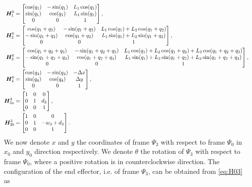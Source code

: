 \documentclass[../DC2017114Bouma.tex]{subfiles}
\begin{document}
\begin{align}
{\boldsymbol{H}}^0_1 &= \begin{bmatrix}
\cos(q_1) & -\sin(q_1) & L_1\cos(q_1) \\
\sin(q_1) & \cos(q_1) & L_1\sin(q_1)\\
0 & 0 & 1
\end{bmatrix},\label{eq:H01}\\
{\boldsymbol{H}}^0_2 &= \begin{bmatrix}
\cos(q_1+q_2) & -\sin(q_1+q_2) & L_1\cos(q_1) + L_2\cos(q_1+q_2) \\
-\sin(q_1+q_2) & \cos(q_1+q_2) & L_1\sin(q_1) + L_2\sin(q_1+q_2)\\
0 & 0 & 1 
\end{bmatrix},\label{eq:H02}\\
{\boldsymbol{H}}^0_3 &= \begin{bmatrix}
\cos(q_1+q_2+q_3) & -\sin(q_1+q_2+q_3) & L_1\cos(q_1) + L_2\cos(q_1+q_2) + L_3\cos(q_1+q_2+q_3) \\
-\sin(q_1+q_2+q_3) & \cos(q_1+q_2+q_3) & L_1\sin(q_1) + L_2\sin(q_1+q_2) + L_3\sin(q_1+q_2+q_3)\\
0 & 0 & 1 
\end{bmatrix},\label{eq:H03}\\
{\boldsymbol{H}}^0_4 &= \begin{bmatrix}
\cos(q_4) & -\sin(q_4) & -\Delta x \\
\sin(q_4) & \cos(q_4) & \Delta y\\
0 & 0 & 1
\end{bmatrix},\label{eq:H04}\\
{\boldsymbol{H}}^3_{3a} &= \begin{bmatrix}
1 & 0 & 0 \\
0 & 1 & d_3\\
0 & 0 & 1
\end{bmatrix},\label{eq:H33a}\\
{\boldsymbol{H}}^3_{3b} &= \begin{bmatrix}
1 & 0 & 0 \\
0 & 1 & -w_3 + d_3\\
0 & 0 & 1
\end{bmatrix}.\label{eq:H33b}
\end{align}
We now denote $x$ and $y$ the coordinates of frame $\Psi_3$ with respect to frame $\Psi_0$ in $x_0$ and $y_0$ direction respectively. We denote $\theta$ the rotation of $\Psi_3$ with respect to frame $\Psi_0$, where a positive rotation is in counterclockwise direction. The configuration of the end effector, i.e. of frame $\Psi_3$, can be obtained from \eqref{eq:H03} as
\end{document}
